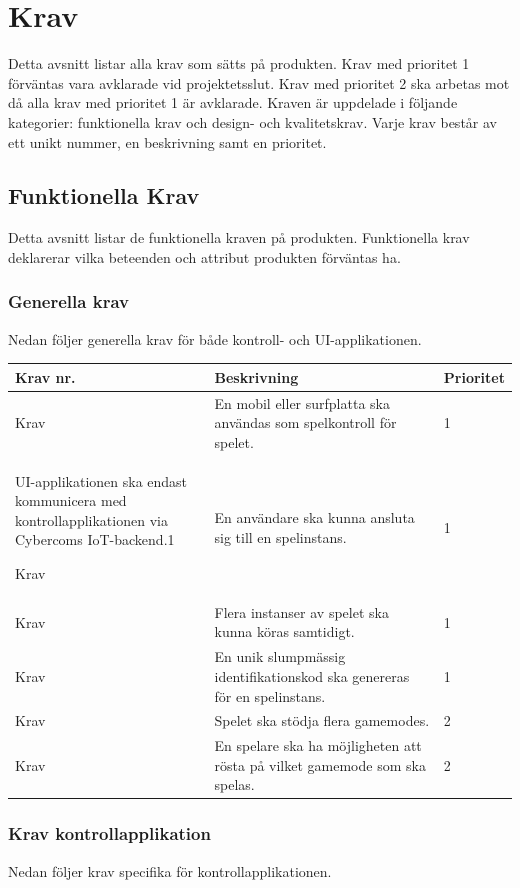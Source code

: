 \documentclass[10pt]{article}
\newcounter{indexcounter}
\newcommand{\Krav}[2]{
	\stepcounter{indexcounter}
	Krav \arabic{indexcounter} & #1 & #2 \\ \hline
}
\begin{document}
\pagebreak
\section{Krav}
	Detta avsnitt listar alla krav som sätts på produkten. Krav med prioritet 1 förväntas vara avklarade vid projektetsslut. Krav med prioritet 2 ska arbetas mot då alla krav med prioritet 1 är avklarade. Kraven är uppdelade i följande kategorier: funktionella krav och design- och kvalitetskrav. Varje krav består av ett unikt nummer, en beskrivning samt en prioritet.
	
	\subsection{Funktionella Krav}
	Detta avsnitt listar de funktionella kraven på produkten. Funktionella krav deklarerar vilka beteenden och attribut produkten förväntas ha. 

	\subsubsection*{Generella krav}
	Nedan följer generella krav för både kontroll- och UI-applikationen.\\
	
	\begin{tabular}{| p{2cm} | p{8cm} | p{2cm}|}
		\hline
		
		\textbf{Krav nr.} & \textbf{Beskrivning} &\textbf{Prioritet} \\ \hline
		\Krav{En mobil eller surfplatta ska användas som spelkontroll för spelet.}{1}
		\Krav{UI-applikationen ska endast kommunicera med \newline kontrollapplikationen via  Cybercoms IoT-backend.}{1}
		\Krav{En användare ska kunna ansluta sig till en spelinstans.}{1}
		\Krav{Flera instanser av spelet ska kunna köras samtidigt.}{1}
		\Krav{En unik slumpmässig identifikationskod ska genereras för en spelinstans.}{1}
		\Krav{Spelet ska stödja flera gamemodes.}{2}
		\Krav{En spelare ska ha möjligheten att rösta på vilket gamemode som ska spelas.}{2}
				
	\end{tabular}

	\subsubsection*{Krav kontrollapplikation}
	Nedan följer krav specifika för kontrollapplikationen.\\
\end{document}
